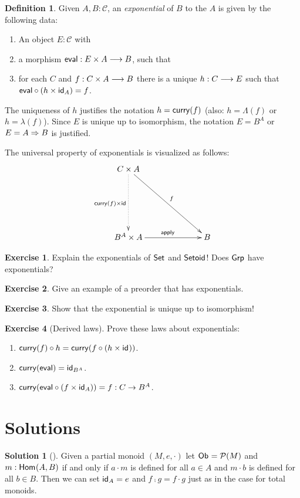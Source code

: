 \documentclass[a4paper,fleqn]{scrartcl}
\theoremstyle{definition}
\newtheorem{definition}{Definition}
\newtheorem*{solution}{Solution}
\newtheorem{exercise}{Exercise}
\newcommand{\C}{\mathcal{C}}
\begin{document}
\begin{definition}
  Given $A,B : \C$, an \emph{exponential} of $B$ to the $A$ is given
  by the following data:
  \begin{enumerate}
  \item An object $E : \C$ with
  \item a morphism $\teval : E \times A \too B$, such that
  \item for each $C$ and $f : C \times A \too B$ there is a unique $h
    : C \too E$ such that $\teval \comp (h \times \id[A]) = f$.
  \end{enumerate}
  The uniqueness of $h$ justifies the notation $h = \tcurry(f)$ (also:
  $h = \Lambda(f)$ or $h = \lambda(f)$).
  Since $E$ is unique up to isomorphism, the notation $E = B^A$ or $E
  = A \To B$ is justified.
\end{definition}
The universal property of exponentials is visualized as follows:
\[
\xymatrix@=16ex{
  C \times A \ar@{.>}[d]_{\tcurry(f) \times \tid}
      \ar[dr]^{f}\\
  B^A \times A \ar[r]^{\tapply} & B \\
}
\]
\begin{exercise}
  Explain the exponentials of $\Set$ and $\Setoid$!
  Does $\Grp$ have exponentials?
\end{exercise}
\begin{exercise}
  Give an example of a preorder that has exponentials.
\end{exercise}
\begin{exercise}
  Show that the exponential is unique up to isomorphism!
\end{exercise}
\begin{exercise}[Derived laws]
   Prove these laws about exponentials:
   \begin{enumerate}
   \item $\tcurry(f) \comp h = \tcurry(f \comp (h \times \id))$.
   \item $\tcurry(\teval) = \id[B^A]$.
   \item $\tcurry(\teval \comp (f \times \id[A])) = f : C \to B^A$.
   \end{enumerate}
\end{exercise}


\printbibliography

\clearpage

\appendix

\section{Solutions}

\begin{solution}[]
  Given a partial monoid $(M,e,\cdot)$ let $\Ob = \Pot(M)$ and
  $m : \Hom(A,B)$ if and only if $a \cdot m$ is defined for all $a \in A$ and $m
  \cdot b$ is defined for all $b \in B$.  Then we can set $\id[A] = e$
  and $f \comp g = f \cdot g$ just as in the case for total monoids.
\end{solution}
\end{document}
